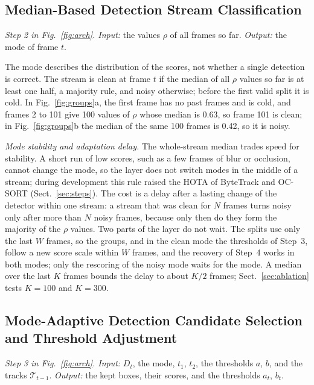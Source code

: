 \subsection{Median-Based Detection Stream Classification}\label{sec:regimes}
\emph{Step 2 in Fig.~\ref{fig:arch}. Input:} the values $\rho$ of all frames so far. \emph{Output:} the mode of frame $t$.

The mode describes the distribution of the scores, not whether a single detection is correct. The
stream is clean at frame $t$ if the median of all $\rho$ values so far is at least one half, a
majority rule, and noisy otherwise; before the first valid split it is cold. In
Fig.~\ref{fig:groups}a, the first frame has no past frames and is cold, and frames 2 to 101 give 100
values of $\rho$ whose median is 0.63, so frame 101 is clean; in Fig.~\ref{fig:groups}b the median of
the same 100 frames is 0.42, so it is noisy.

\emph{Mode stability and adaptation delay.} The whole-stream median trades speed for stability. A
short run of low scores, such as a few frames of blur or occlusion, cannot change the mode, so the
layer does not switch modes in the middle of a stream; during development this rule raised the
HOTA of ByteTrack and OC-SORT (Sect.~\ref{sec:steps}). The cost is a delay after a lasting change
of the detector within one stream: a stream that was clean for $N$ frames turns noisy only after
more than $N$ noisy frames, because only then do they form the majority of the $\rho$ values. Two
parts of the layer do not wait. The splits use only the last $W$ frames, so the groups, and in
the clean mode the thresholds of Step~3, follow a new score scale within $W$ frames, and the
recovery of Step~4 works in both modes; only the rescoring of the noisy mode waits for the mode. A
median over the last $K$ frames bounds the delay to about $K/2$ frames;
Sect.~\ref{sec:ablation} tests $K=100$ and $K=300$.

\subsection{Mode-Adaptive Detection Candidate Selection and Threshold Adjustment}\label{sec:choice}
\emph{Step 3 in Fig.~\ref{fig:arch}. Input:} $D_t$, the mode, $t_1$, $t_2$, the thresholds $a$, $b$, and the tracks
$\mathcal{T}_{t-1}$. \emph{Output:} the kept boxes, their scores, and the thresholds $a_t$, $b_t$.

